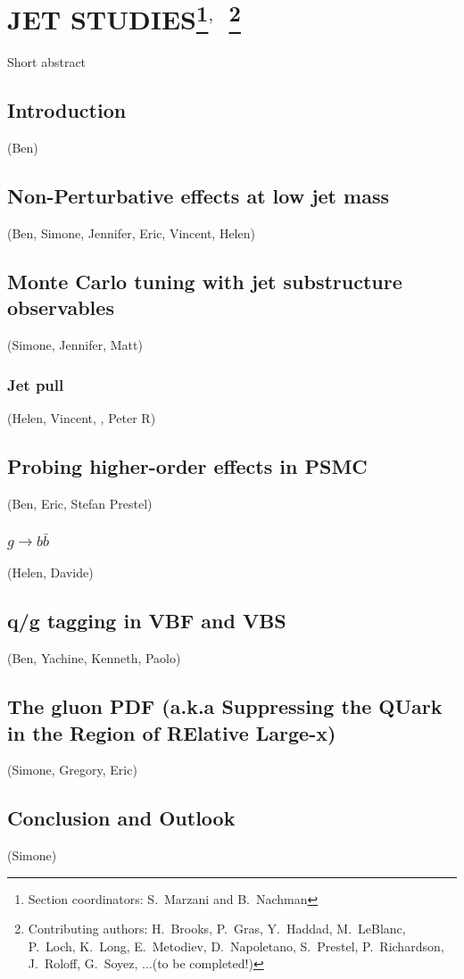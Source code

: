 \documentclass[11pt]{cernrep}
\begin{document}
\section{JET STUDIES\protect\footnote{Section coordinators: S.~Marzani and B.~Nachman}$^{,}$~\protect\footnote{Contributing authors: H.~Brooks, P.~Gras, Y.~Haddad, M.~LeBlanc, P.~Loch, K.~Long, E.~Metodiev, D.~Napoletano, S.~Prestel, P.~Richardson, J.~Roloff, G.~Soyez, ...(to be completed!)}}

Short abstract

\subsection{Introduction}
(Ben)

\subsection{Non-Perturbative effects at low jet mass}
(Ben, Simone, Jennifer, Eric, Vincent, Helen)
\subsection{Monte Carlo tuning with jet substructure observables}
(Simone, Jennifer, Matt)
\subsubsection{Jet pull}
(Helen, Vincent, , Peter R)

\subsection{Probing higher-order effects in PSMC}
(Ben, Eric, Stefan Prestel)
\subsubsection{$g\to b \bar b$}
(Helen, Davide)


\subsection{q/g tagging in VBF and VBS}
(Ben, Yachine, Kenneth, Paolo)

\subsection{The gluon PDF (a.k.a Suppressing the QUark in the Region of RElative Large-x)}
(Simone, Gregory, Eric)
\subsection{Conclusion and Outlook}
(Simone)
\end{document}
